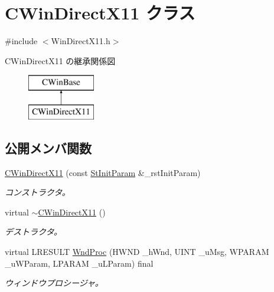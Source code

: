\hypertarget{class_c_win_direct_x11}{}\section{C\+Win\+Direct\+X11 クラス}
\label{class_c_win_direct_x11}


{\ttfamily \#include $<$Win\+Direct\+X11.\+h$>$}

C\+Win\+Direct\+X11 の継承関係図\begin{figure}[H]
\begin{center}
\leavevmode
\includegraphics[height=2.000000cm]{class_c_win_direct_x11}
\end{center}
\end{figure}
\subsection*{公開メンバ関数}
\begin{DoxyCompactItemize}
\item 
\hyperlink{class_c_win_direct_x11_a3fa4a47732c85ab2c0646afe56be4617}{C\+Win\+Direct\+X11} (const \hyperlink{struct_c_win_base_1_1_st_init_param}{St\+Init\+Param} \&\+\_\+rst\+Init\+Param)
\begin{DoxyCompactList}\small\item\em コンストラクタ。 \end{DoxyCompactList}\item 
virtual \hyperlink{class_c_win_direct_x11_ad26e687caf4b1cb793466119e657b150}{$\sim$\+C\+Win\+Direct\+X11} ()
\begin{DoxyCompactList}\small\item\em デストラクタ。 \end{DoxyCompactList}\item 
virtual L\+R\+E\+S\+U\+L\+T \hyperlink{class_c_win_direct_x11_aac1053a3e7bba9cd66e60e45f754a06e}{Wnd\+Proc} (H\+W\+N\+D \+\_\+h\+Wnd, U\+I\+N\+T \+\_\+u\+Msg, W\+P\+A\+R\+A\+M \+\_\+u\+W\+Param, L\+P\+A\+R\+A\+M \+\_\+u\+L\+Param) final
\begin{DoxyCompactList}\small\item\em ウィンドウプロシージャ。 \end{DoxyCompactList}\end{DoxyCompactItemize}
